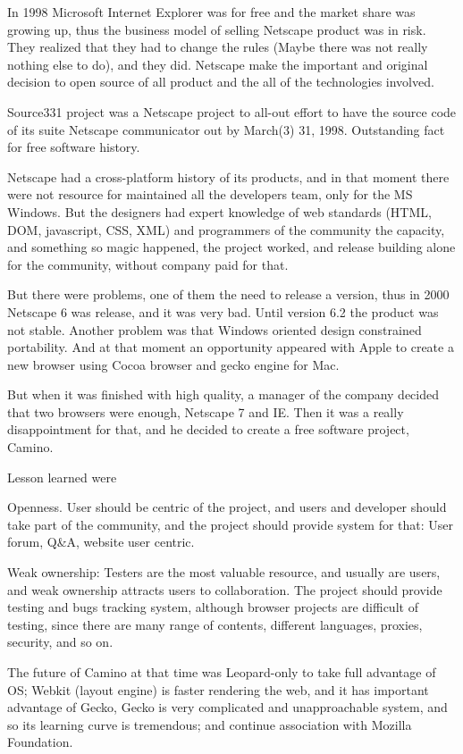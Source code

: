 \documentclass[11pt]{article}
\begin{document}
In 1998 Microsoft Internet Explorer was for free and the market share was growing up, thus the business model of selling Netscape product was in risk. They realized that they had to change the rules (Maybe there was not really nothing else to do), and they did. Netscape make the important and original decision to open source of all product and the all of the technologies involved.

Source331 project was a Netscape project to all-out effort to have the source code of its suite Netscape communicator out by March(3) 31, 1998. Outstanding fact for free software history.

Netscape had  a cross-platform history of its products, and in that moment there were not resource for maintained all the developers team, only for the MS Windows. But the designers had expert knowledge of web standards (HTML, DOM, javascript, CSS, XML) and programmers of the community the capacity, and something so magic happened, the project worked, and release building alone for the community, without company paid for that.

But there were problems, one of them the need to release a version, thus in 2000 Netscape 6 was release, and it was very bad. Until version 6.2 the product was not stable. Another problem was that Windows oriented design constrained portability. And at that moment an opportunity appeared with Apple to create a new browser using Cocoa browser and gecko engine for Mac. 

But when it was finished with high quality, a manager of the company decided that two browsers were enough, Netscape 7 and IE. Then it was a really disappointment for that, and he decided to create a free software project, Camino.

Lesson learned were

Openness. User should be centric of the project, and users and developer should take part of the community, and the project should provide system for that: User forum, Q\&A, website user centric.

Weak ownership:	Testers are the most valuable resource, and usually are users, and weak ownership attracts users to collaboration. The project should provide testing and bugs tracking system, although browser projects are difficult of testing, since there are many range of contents, different languages, proxies, security, and so on.
	
The future of Camino at that time was Leopard-only to take full advantage of OS; 	Webkit (layout engine) is faster rendering the web, and it has important advantage of Gecko, Gecko is very complicated and unapproachable system,  and so its learning curve is tremendous; and continue association with Mozilla Foundation.
	
\end{document}
